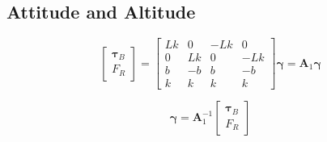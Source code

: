 \subsection{Attitude and Altitude}

\[
\begin{bmatrix}
\boldsymbol\tau_B \\ F_R
\end{bmatrix}
=
\begin{bmatrix}
Lk & 0  & -Lk & 0 \\
0  & Lk & 0   & -Lk \\
b  & -b & b   & -b \\
k  & k  & k   & k
\end{bmatrix}
\boldsymbol\gamma
=
\mathbf{A}_1 \boldsymbol\gamma
\]

\[
\boldsymbol\gamma
=
\mathbf{A}_1^{-1}
\begin{bmatrix}
\boldsymbol\tau_B \\ F_R
\end{bmatrix}
\]

